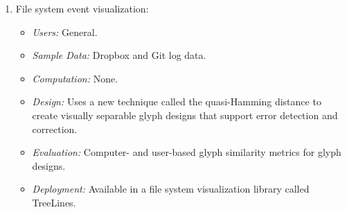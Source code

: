 \begin{enumerate}
\begin{enumerate}
\begin{enumerate}
\begin{itemize}
\end{itemize}
\end{enumerate}

\item File system event visualization:
\begin{itemize}
\item \emph{Users:} General.
\item \emph{Sample Data:} Dropbox and Git log data.
\item \emph{Computation:} None.
\item \emph{Design:} Uses a new technique called the quasi-Hamming distance to create visually separable glyph designs that support error detection and correction.
\item \emph{Evaluation:} Computer- and user-based glyph similarity metrics for glyph designs.
\item \emph{Deployment:} Available in a file system visualization library called TreeLines.
\end{itemize}
\end{enumerate}


\end{enumerate}